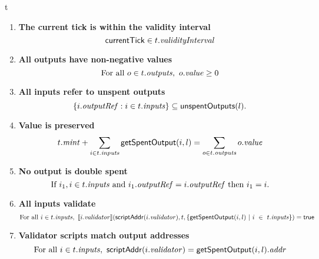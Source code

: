 \begin{ruledfigure}{t}
\begin{enumerate}

\item
  \label{rule:slot-in-range}
  \textbf{The current tick is within the validity interval}
  \begin{displaymath}
    \mathsf{currentTick} \in t.\textit{validityInterval}
  \end{displaymath}

\item
  \label{rule:all-outputs-are-non-negative}
  \textbf{All outputs have non-negative values}
  \begin{displaymath}
    \textrm{For all } o \in t.\mathit{outputs},\ o.\mathit{value} \geq 0
  \end{displaymath}

\item
  \label{rule:all-inputs-refer-to-unspent-outputs}
  \textbf{All inputs refer to unspent outputs}
  \begin{displaymath}
    \{i.\mathit{outputRef}: i \in t.\mathit{inputs} \} \subseteq \mathsf{unspentOutputs}(l).
  \end{displaymath}

\item
  \label{rule:value-is-preserved}
  \textbf{Value is preserved}
  \begin{displaymath}
    t.\mathit{mint} + \sum_{i \in t.\mathit{inputs}} \mathsf{getSpentOutput}(i, l) = \sum_{o \in t.\mathit{outputs}} o.\mathit{value}
  \end{displaymath}

\item
  \label{rule:no-double-spending}
  \textbf{No output is double spent}
  \begin{displaymath}
    \textrm{If } i_1, i \in t.\mathit{inputs} \textrm{ and }  i_1.\mathit{outputRef} = i.\mathit{outputRef}
    \textrm{ then } i_1 = i.
  \end{displaymath}

\item
  \label{rule:all-inputs-validate}
  \textbf{All inputs validate}
  \begin{displaymath}
    \textrm{For all } i \in t.\mathit{inputs},\
    \llbracket i.\mathit{validator}\rrbracket(\mathsf{scriptAddr}(i.\mathit{validator}), t,
    \{\mathsf{getSpentOutput}(i, l) ~\vert~ i~\in~ t.\mathit{inputs}\}) = \textsf{true}
  \end{displaymath}

\item
  \label{rule:validator-scripts-hash}
  \textbf{Validator scripts match output addresses}
  \begin{displaymath}
    \textrm{For all } i \in t.\mathit{inputs},\ \mathsf{scriptAddr}(i.\mathit{validator}) = \mathsf{getSpentOutput}(i, l).\mathit{addr}
  \end{displaymath}


\end{enumerate}
\end{ruledfigure}
